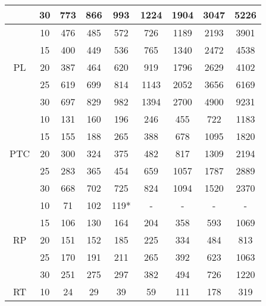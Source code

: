 \begin{table}[]
{\begin{tabular}{|c|c|ccccccc|}
&30                                                           & 773 &  866 &  993 & 1224 & 1904 & 3047 & 5226  \\
\hline
\hline
\multirow{5}{*}{PL}&10                                        & 476  & 485  & 572  & 726 & 1189 & 2193 & 3901  \\
&15                                                           & 400 & 449 & 536 & 765 & 1340 & 2472 & 4538   \\
&20                                                           & 387 & 464 & 620 & 919 & 1796 & 2629 & 4102  \\
&25                                                           & 619  & 699 & 814 & 1143 & 2052 & 3656 & 6169  \\
&30                                                           & 697 &  829 &  982 & 1394 & 2700 & 4900 & 9231  \\
\hline
\hline
\multirow{5}{*}{PTC}&10                                        & 131  & 160  & 196  & 246 & 455 & 722 & 1183  \\
&15                                                           & 155 & 188 & 265 & 388 & 678 & 1095 & 1820   \\
&20                                                           & 300 & 324 & 375 & 482 & 817 & 1309 & 2194  \\
&25                                                           & 283  & 365 & 454 & 659 & 1057 & 1787 & 2889  \\
&30                                                           & 668 &  702 &  725 & 824 & 1094 & 1520 & 2370  \\
\hline
\hline
\multirow{5}{*}{RP}&10                                        & 71  & 102  & 119*  & - & - & - &  -  \\
&15                                                           & 106 & 130 & 164 & 204 & 358 & 593 & 1069   \\
&20                                                           & 151 & 152 & 185 & 225 & 334 & 484 & 813  \\
&25                                                           & 170  & 191 & 211 & 265 & 392 & 623 & 1063  \\
&30                                                           & 251 &  275 &  297 & 382 & 494 & 726 & 1220  \\
\hline
\hline
\multirow{5}{*}{RT}&10                                        & 24  & 29  & 39  & 59 & 111 & 178 & 319  \\

\end{tabular}}
\end{table}
